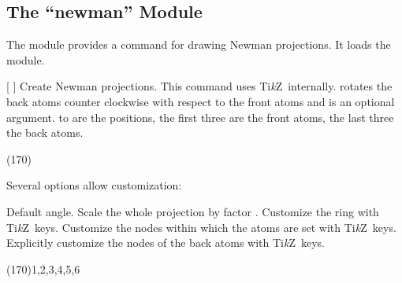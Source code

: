 \documentclass{chemmacros-manual}
\makeatletter
\newcommand*\TikZ{Ti\textit{k}Z}
\def\chemmodule*#1{\textquotedblleft#1\textquotedblright}%
\renewenvironment{commands}
  {%
    \let\command\cnltx@command
    \let\explcommand\cnltx@explcommand
    \cnltxlist
  }
  {\endcnltxlist}
\makeatother
\begin{document}
\subsection{The \chemmodule*{newman} Module}\label{sec:newman-module}
The  module provides a command for drawing Newman
projections.  It loads the  module.
\begin{commands}
  \command{newman}[%
    ]
    Create Newman projections.  This command uses \TikZ\ internally.
     rotates the back atoms counter clockwise with respect to the
    front atoms and is an optional argument.   to  are the
    positions, the first three are the front atoms, the last three the back
    atoms.
\end{commands}

\begin{example}
  \newman{} \newman(170){}
    
\end{example}

Several options allow customization:
\begin{options}
    Default angle.
    Scale the whole projection by factor .
  \Default
    Customize the ring with \TikZ\ keys.
  \Default
    Customize the nodes within which the atoms are set with \TikZ\ keys.
  \Default
    Explicitly customize the nodes of the back atoms with \TikZ\ keys.
\end{options}

\begin{example}
   \newman{}
  \newman[scale=.75,ring={draw=blue,fill=blue!20}]{}
\end{example}

\begin{example}
\end{example}

\begin{example}
   \newman(170){1,2,3,4,5,6}
\end{example}
\end{document}

